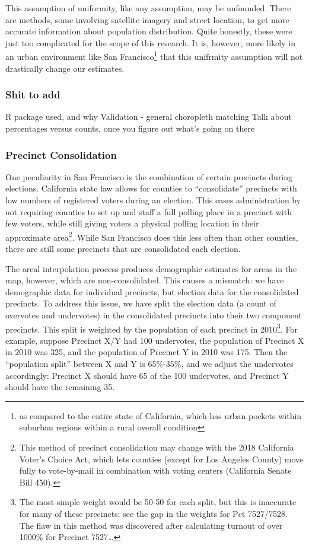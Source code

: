 \documentclass[12pt,twoside]{reedthesis}
\theoremstyle{definition}
\theoremstyle{definition}
\theoremstyle{definition}
\theoremstyle{remark}
\begin{document}
This assumption of uniformity, like any assumption, may be unfounded.
There are methods, some involving satellite imagery and street location,
to get more accurate information about population distribution. Quite
honestly, these were just too complicated for the scope of this
research. It is, however, more likely in an urban environment like San
Francisco\footnote{as compared to the entire state of California, which
  has urban pockets within suburban regions within a rural overall
  condition} that this unifrmity assumption will not drastically change
our estimates.

\hypertarget{shit-to-add}{%
\subsubsection{Shit to add}\label{shit-to-add}}

R package used, and why Validation - general choropleth matching Talk
about percentages versus counts, once you figure out what's going on
there

\hypertarget{precinct-consolidation}{%
\subsubsection{Precinct Consolidation}\label{precinct-consolidation}}

One peculiarity in San Francisco is the combination of certain precincts
during elections. California state law allows for counties to
``consolidate'' precincts with low numbers of registered voters during
an election. This eases administration by not requiring counties to set
up and staff a full polling place in a precinct with few voters, while
still giving voters a physical polling location in their approximate
area\footnote{This method of precinct consolidation may change with the
  2018 California Voter's Choice Act, which lets counties (except for
  Los Angeles County) move fully to vote-by-mail in combination with
  voting centers (California Senate Bill 450).}. While San Francisco
does this less often than other counties, there are still some precincts
that are consolidated each election.

The areal interpolation process produces demographic estimates for areas
in the map, however, which are non-consolidated. This causes a mismatch:
we have demographic data for individual precincts, but election data for
the consolidated precincts. To address this issue, we have split the
election data (a count of overvotes and undervotes) in the consolidated
precincts into their two component precincts. This split is weighted by
the population of each precinct in 2010\footnote{The most simple weight
  would be 50-50 for each split, but this is inaccurate for many of
  these precincts: see the gap in the weights for Pct 7527/7528. The
  flaw in this method was discovered after calculating turnout of over
  1000\% for Precinct 7527\ldots{}}. For example, suppose Precinct X/Y
had 100 undervotes, the population of Precinct X in 2010 was 325, and
the population of Precinct Y in 2010 was 175. Then the ``population
split'' between X and Y is 65\%-35\%, and we adjust the undervotes
accordingly: Precinct X should have 65 of the 100 undervotes, and
Precinct Y should have the remaining 35.
\end{document}
